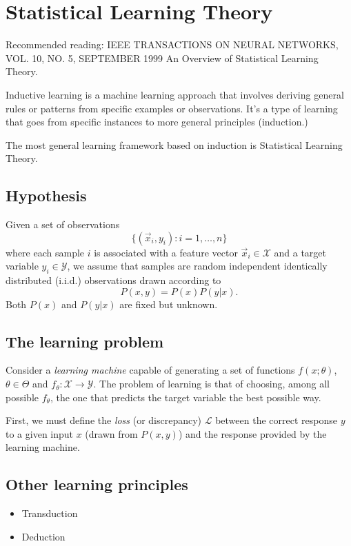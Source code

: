 \chapter{Statistical Learning Theory}

Recommended reading: IEEE TRANSACTIONS ON NEURAL NETWORKS, VOL. 10, NO. 5, SEPTEMBER 1999
An Overview of Statistical Learning Theory.

Inductive learning is a machine learning approach that involves deriving general rules or
patterns from specific examples or observations. It's a type of learning that goes from
specific instances to more general principles (induction.)

The most general learning framework based on induction is Statistical Learning Theory.

\section{Hypothesis}

Given a set of observations $$\big\{(\vec{x}_i, y_i) : i = 1, \dots, n \big\}$$ where each sample
$i$ is associated with a feature vector $\vec{x}_i \in \mathcal{X}$ and a target variable
$y_i \in \mathcal{Y}$, we assume that samples are random independent identically
distributed (i.i.d.) observations drawn according to $$P(x, y) = P(x) P(y | x)\text{.}$$
Both $P(x)$ and $P(y|x)$ are fixed but unknown.

\section{The learning problem}

Consider a \emph{learning machine} capable of generating a set of functions $f(x;
\theta)$, $\theta \in \Theta$ and $f_\theta : \mathcal{X} \rightarrow \mathcal{Y}$.
The problem of learning is that of choosing, among all possible $f_\theta$, the one that
predicts the target variable the best possible way.

First, we must define the \emph{loss} (or discrepancy) $\mathcal{L}$ between the correct
response $y$ to a given input $x$ (drawn from $P(x, y)$) and the response provided by the
learning machine.

\section{Other learning principles}

\begin{itemize}
  \item Transduction
  \item Deduction
\end{itemize}
